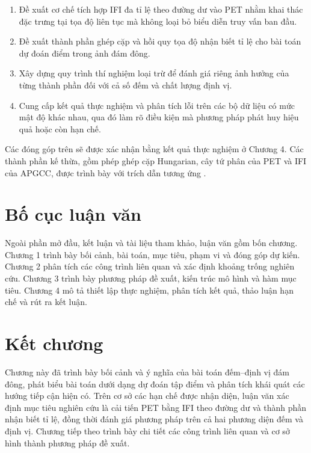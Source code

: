 \begin{enumerate}[label=\arabic*)]
    \item Đề xuất cơ chế tích hợp IFI đa tỉ lệ theo đường dư vào PET nhằm khai thác đặc trưng tại tọa độ liên tục mà không loại bỏ biểu diễn truy vấn ban đầu.
    \item Đề xuất thành phần ghép cặp và hồi quy tọa độ nhận biết tỉ lệ cho bài toán dự đoán điểm trong ảnh đám đông.
    \item Xây dựng quy trình thí nghiệm loại trừ để đánh giá riêng ảnh hưởng của từng thành phần đối với cả số đếm và chất lượng định vị.
    \item Cung cấp kết quả thực nghiệm và phân tích lỗi trên các bộ dữ liệu có mức mật độ khác nhau, qua đó làm rõ điều kiện mà phương pháp phát huy hiệu quả hoặc còn hạn chế.
\end{enumerate}

Các đóng góp trên sẽ được xác nhận bằng kết quả thực nghiệm ở Chương 4. Các thành phần kế thừa, gồm phép ghép cặp Hungarian, cây tứ phân của PET và IFI của APGCC, được trình bày với trích dẫn tương ứng \cite{song2021p2pnet,liu2023pet,chen2024apgcc}.

\section{Bố cục luận văn}

Ngoài phần mở đầu, kết luận và tài liệu tham khảo, luận văn gồm bốn chương. Chương 1 trình bày bối cảnh, bài toán, mục tiêu, phạm vi và đóng góp dự kiến. Chương 2 phân tích các công trình liên quan và xác định khoảng trống nghiên cứu. Chương 3 trình bày phương pháp đề xuất, kiến trúc mô hình và hàm mục tiêu. Chương 4 mô tả thiết lập thực nghiệm, phân tích kết quả, thảo luận hạn chế và rút ra kết luận.

\section{Kết chương}

Chương này đã trình bày bối cảnh và ý nghĩa của bài toán đếm--định vị đám đông, phát biểu bài toán dưới dạng dự đoán tập điểm và phân tích khái quát các hướng tiếp cận hiện có. Trên cơ sở các hạn chế được nhận diện, luận văn xác định mục tiêu nghiên cứu là cải tiến PET bằng IFI theo đường dư và thành phần nhận biết tỉ lệ, đồng thời đánh giá phương pháp trên cả hai phương diện đếm và định vị. Chương tiếp theo trình bày chi tiết các công trình liên quan và cơ sở hình thành phương pháp đề xuất.
